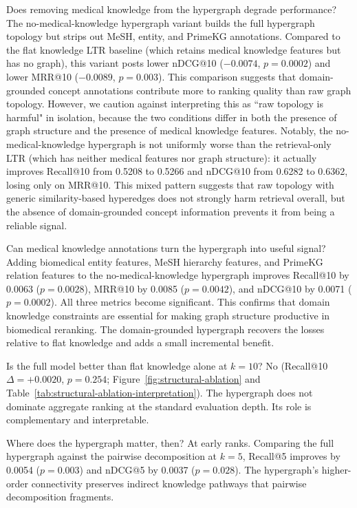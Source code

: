 Does removing medical knowledge from the hypergraph degrade performance? The no-medical-knowledge hypergraph variant builds the full hypergraph topology but strips out MeSH, entity, and PrimeKG annotations. Compared to the flat knowledge LTR baseline (which retains medical knowledge features but has no graph), this variant posts lower nDCG@10 ($-0.0074$, $p{=}0.0002$) and lower MRR@10 ($-0.0089$, $p{=}0.003$). This comparison suggests that domain-grounded concept annotations contribute more to ranking quality than raw graph topology. However, we caution against interpreting this as ``raw topology is harmful" in isolation, because the two conditions differ in both the presence of graph structure and the presence of medical knowledge features. Notably, the no-medical-knowledge hypergraph is not uniformly worse than the retrieval-only LTR (which has neither medical features nor graph structure): it actually improves Recall@10 from 0.5208 to 0.5266 and nDCG@10 from 0.6282 to 0.6362, losing only on MRR@10. This mixed pattern suggests that raw topology with generic similarity-based hyperedges does not strongly harm retrieval overall, but the absence of domain-grounded concept information prevents it from being a reliable signal.

Can medical knowledge annotations turn the hypergraph into useful signal? Adding biomedical entity features, MeSH hierarchy features, and PrimeKG relation features to the no-medical-knowledge hypergraph improves Recall@10 by 0.0063 ($p{=}0.0028$), MRR@10 by 0.0085 ($p{=}0.0042$), and nDCG@10 by 0.0071 ($p{=}0.0002$). All three metrics become significant. This confirms that domain knowledge constraints are essential for making graph structure productive in biomedical reranking. The domain-grounded hypergraph recovers the losses relative to flat knowledge and adds a small incremental benefit.

Is the full model better than flat knowledge alone at $k{=}10$? No (Recall@10 $\Delta{=}+0.0020$, $p{=}0.254$; Figure~\ref{fig:structural-ablation} and Table~\ref{tab:structural-ablation-interpretation}). The hypergraph does not dominate aggregate ranking at the standard evaluation depth. Its role is complementary and interpretable.



Where does the hypergraph matter, then? At early ranks. Comparing the full hypergraph against the pairwise decomposition at $k{=}5$, Recall@5 improves by 0.0054 ($p{=}0.003$) and nDCG@5 by 0.0037 ($p{=}0.028$). The hypergraph's higher-order connectivity preserves indirect knowledge pathways that pairwise decomposition fragments.

